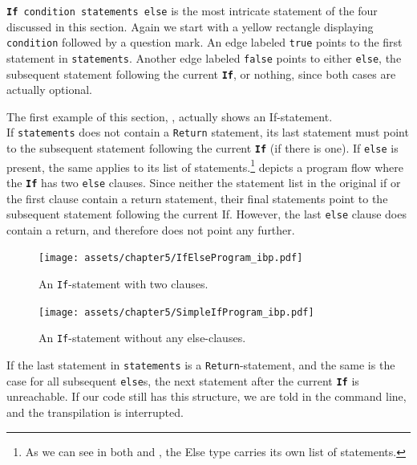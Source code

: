 \texttt{\textbf{If} condition statements else} is the most intricate statement of the four discussed in this section. Again we start with a yellow rectangle displaying \texttt{condition} followed by a question mark. An edge labeled \texttt{true} points to the first statement in \texttt{statements}. Another edge labeled \texttt{false} points to either \texttt{else}, the subsequent statement following the current \texttt{\textbf{If}}, or nothing, since both cases are actually optional.

The first example of this section, , actually shows an If-statement. \\

If \texttt{statements} does not contain a \texttt{Return} statement, its last statement must point to the subsequent statement following the current \texttt{\textbf{If}} (if there is one). If \texttt{else} is present, the same applies to its list of statements.\footnote{As we can see in both  and , the Else type carries its own list of statements.}  depicts a program flow where the \texttt{\textbf{If}} has two \texttt{else} clauses. Since neither the statement list in the original if or the first clause contain a return statement, their final statements point to the subsequent statement following the current If. However, the last \texttt{else} clause does contain a return, and therefore does not point any further. \\

\begin{figure}[ht]
    \centering
    \texttt{[image: assets/chapter5/IfElseProgram\_ibp.pdf]}
    \caption{An \texttt{If}-statement with two clauses.}
    \label{flowchartIf}
\end{figure}

\begin{figure}[ht]
    \centering
    \texttt{[image: assets/chapter5/SimpleIfProgram\_ibp.pdf]}
    \caption{An \texttt{If}-statement without any else-clauses.}
    \label{flowchartIf2}
\end{figure}

If the last statement in \texttt{statements} is a \texttt{Return}-statement, and the same is the case for all subsequent \texttt{else}s, the next statement after the current \texttt{\textbf{If}} is unreachable. If our code still has this structure, we are told in the command line, and the transpilation is interrupted.

